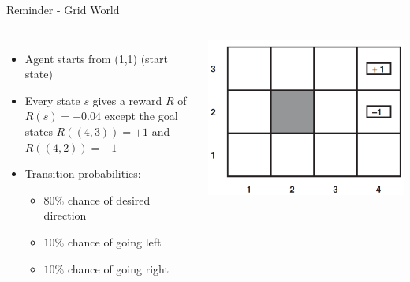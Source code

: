 \begin{frame}[c]{Reminder - Grid World}
\begin{columns}[c]
		\begin{itemize}
			\item Agent starts from (1,1) (start state)
			\item Every state $s$ gives a reward $R$ of $R(s)=-0.04$ except the goal states $R((4,3))=+1$ and $R((4,2))=-1$
			\item Transition probabilities:
				\begin{itemize}
					\item $80\%$ chance of desired direction
					\item $10\%$ chance of going left
					\item $10\%$ chance of going right
				\end{itemize}
		\end{itemize}
	\begin{center}
		\includegraphics[width=0.9\linewidth]{img-elias/no_utilities.png}
	\end{center}
\end{columns}
\end{frame}

